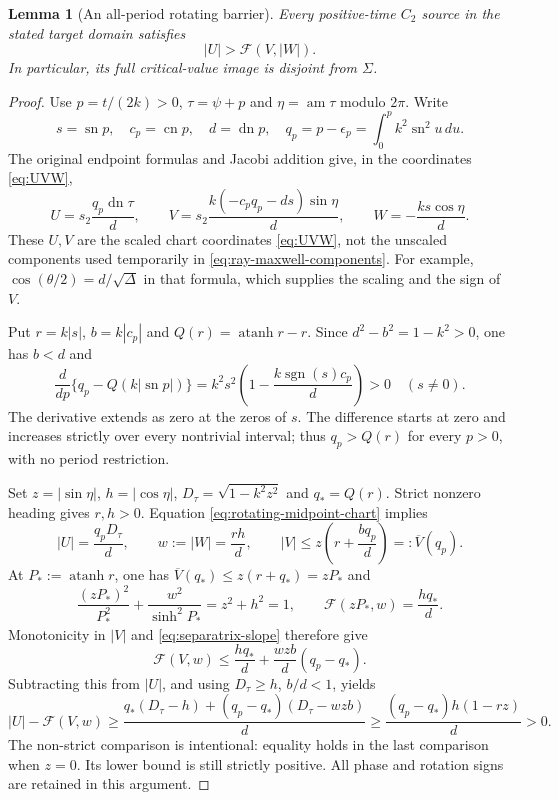 \documentclass[11pt,a4paper]{article}
\newtheorem{lemma}[theorem]{Lemma}
\theoremstyle{remark}\newtheorem{remark}[theorem]{Remark}
\newcommand{\sn}{\operatorname{sn}}
\newcommand{\cn}{\operatorname{cn}}
\newcommand{\dn}{\operatorname{dn}}
\newcommand{\atanh}{\operatorname{atanh}}
\begin{document}
\begin{lemma}[An all-period rotating barrier]\label{lem:rotating-barrier}
Every positive-time $C_2$ source in the stated target domain satisfies
\begin{equation}\label{eq:rotating-barrier}
 |U|>\mathcal F(V,|W|).
\end{equation}
In particular, its full critical-value image is disjoint from $\Sigma$.
\end{lemma}
\begin{proof}
Use $p=t/(2k)>0$, $\tau=\psi+p$ and
$\eta=\operatorname{am}\tau$ modulo $2\pi$. Write
\[
 s=\sn p,\quad c_p=\cn p,\quad d=\dn p,\quad
 q_p=p-\epsilon_p=\int_0^p k^2\sn^2u\,du.
\]
The original endpoint formulas \cite[Section 3.3]{MS} and Jacobi
addition give, in the coordinates \eqref{eq:UVW},
\begin{equation}\label{eq:rotating-midpoint-chart}
 U=s_2\frac{q_p\dn\tau}{d},\qquad
 V=s_2\frac{k(-c_pq_p-ds)\sin\eta}{d},\qquad
 W=-\frac{ks\cos\eta}{d}.
\end{equation}
These $U,V$ are the scaled chart coordinates \eqref{eq:UVW}, not
the unscaled components used temporarily in \eqref{eq:ray-maxwell-components}.
For example, $\cos(\theta/2)=d/\sqrt\Delta$ in that formula,
which supplies the scaling and the sign of $V$.

Put $r=k|s|$, $b=k|c_p|$ and $Q(r)=\atanh r-r$. Since
$d^2-b^2=1-k^2>0$, one has $b<d$ and
\[
 \frac{d}{dp}\{q_p-Q(k|\sn p|)\}
 =k^2s^2\left(1-\frac{k\operatorname{sgn}(s)c_p}{d}\right)>0
 \quad(s\ne0).
\]
The derivative extends as zero at the zeros of $s$. The difference
starts at zero and increases strictly over every nontrivial interval;
thus $q_p>Q(r)$ for every $p>0$, with no period restriction.

Set $z=|\sin\eta|$, $h=|\cos\eta|$,
$D_\tau=\sqrt{1-k^2z^2}$ and $q_*=Q(r)$.
Strict nonzero heading gives $r,h>0$. Equation
\eqref{eq:rotating-midpoint-chart} implies
\[
 |U|=\frac{q_pD_\tau}{d},\qquad w:=|W|=\frac{rh}{d},
 \qquad |V|\le z\left(r+\frac{bq_p}{d}\right)=:\overline V(q_p).
\]
At $P_*:=\atanh r$, one has
$\overline V(q_*)\le z(r+q_*)=zP_*$ and
\[
 \frac{(zP_*)^2}{P_*^2}+\frac{w^2}{\sinh^2P_*}=z^2+h^2=1,
 \qquad \mathcal F(zP_*,w)=\frac{hq_*}{d}.
\]
Monotonicity in $|V|$ and \eqref{eq:separatrix-slope} therefore give
\[
 \mathcal F(V,w)\le \frac{hq_*}{d}
       +\frac{wzb}{d}(q_p-q_*).
\]
Subtracting this from $|U|$, and using $D_\tau\ge h$, $b/d<1$, yields
\begin{equation}\label{eq:rotating-barrier-margin}
 |U|-\mathcal F(V,w)
 \ge\frac{q_*(D_\tau-h)+(q_p-q_*)(D_\tau-wzb)}d
 \ge\frac{(q_p-q_*)h(1-rz)}d>0.
\end{equation}
The non-strict comparison is intentional: equality holds in the last
comparison when $z=0$. Its lower bound is still strictly positive.
All phase and rotation signs are retained in this argument.
\end{proof}
\end{document}
